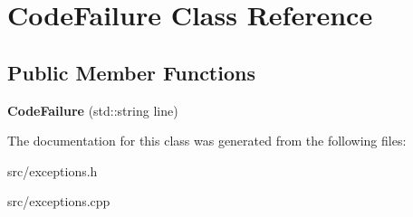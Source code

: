 \hypertarget{class_code_failure}{
\section{CodeFailure Class Reference}
\label{class_code_failure}
}
\subsection*{Public Member Functions}
\begin{DoxyCompactItemize}
\item 
\hypertarget{class_code_failure_af67b88bfae4506c46155c9844dfd9d59}{
{\bfseries CodeFailure} (std::string line)}
\label{class_code_failure_af67b88bfae4506c46155c9844dfd9d59}

\end{DoxyCompactItemize}


The documentation for this class was generated from the following files:\begin{DoxyCompactItemize}
\item 
src/exceptions.h\item 
src/exceptions.cpp\end{DoxyCompactItemize}
